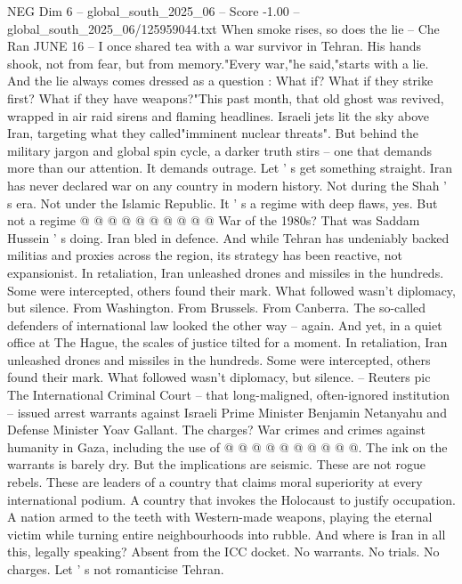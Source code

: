 \begin{textsample}{NEG Dim 6 – global\_south\_2025\_06 – Score -1.00 – global\_south\_2025\_06/125959044.txt}  \label{ex:f6_neg_439}
When smoke rises, so does the lie -- Che Ran JUNE 16 -- I once shared tea with a war survivor in Tehran.
His hands shook, not from fear, but from memory."Every war,"he said,"starts with a lie.
And the lie always comes dressed as a question : What if?
What if they strike first?
What if they have weapons?"This past month, that old ghost was revived, wrapped in air raid sirens and flaming headlines.
Israeli jets lit the sky above Iran, targeting what they called"imminent nuclear threats".
But behind the military jargon and global spin cycle, a darker truth stirs -- one that demands more than our attention.
It demands outrage.
Let ' s get something straight.
Iran has never declared war on any country in modern history.
Not during the Shah ' s era.
Not under the Islamic Republic.
It ' s a regime with deep flaws, yes.
But not a regime @ @ @ @ @ @ @ @ @ @ War of the 1980s?
That was Saddam Hussein ' s doing.
Iran bled in defence.
And while Tehran has undeniably backed militias and proxies across the region, its strategy has been reactive, not expansionist.
In retaliation, Iran unleashed drones and missiles in the hundreds.
Some were intercepted, others found their mark.
What followed wasn't diplomacy, but silence.
From Washington.
From Brussels.
From Canberra.
The so-called defenders of international law looked the other way -- again.
And yet, in a quiet office at The Hague, the scales of justice tilted for a moment.
In retaliation, Iran unleashed drones and missiles in the hundreds.
Some were intercepted, others found their mark.
What followed wasn't diplomacy, but silence. -- Reuters pic The International Criminal Court -- that long-maligned, often-ignored institution -- issued arrest warrants against Israeli Prime Minister Benjamin Netanyahu and Defense Minister Yoav Gallant.
The charges?
War crimes and crimes against humanity in Gaza, including the use of @ @ @ @ @ @ @ @ @ @.
The ink on the warrants is barely dry.
But the implications are seismic.
These are not rogue rebels.
These are leaders of a country that claims moral superiority at every international podium.
A country that invokes the Holocaust to justify occupation.
A nation armed to the teeth with Western-made weapons, playing the eternal victim while turning entire neighbourhoods into rubble.
And where is Iran in all this, legally speaking?
Absent from the ICC docket.
No warrants.
No trials.
No charges.
Let ' s not romanticise Tehran.

\end{textsample}
